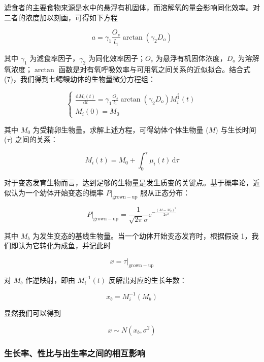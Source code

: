 \documentclass[11pt,a4paper]{ctexart}
\begin{document}
滤食者的主要食物来源是水中的悬浮有机固体，而溶解氧的量会影响同化效率。对二者的浓度加以刻画，可得如下方程

\begin{equation}
a=\gamma_1\frac{O_s}{l_1}\arctan\left(\gamma_2 D_o\right)
\end{equation}

其中 $\gamma_1$ 为滤食率因子，$\gamma_2$ 为同化效率因子；$O_s$ 为悬浮有机固体浓度，$D_o$ 为溶解氧浓度；$\arctan$ 函数是对有氧呼吸效率与可用氧之间关系的近似拟合。结合式 (7)，我们得到七鳃鳗幼体的生物量微分方程组：

\[
\left\{
\begin{array}{l}
\frac{\mathrm{d}M_i(t)}{\mathrm{d}t}=\gamma_1\frac{O_s}{l_1}\arctan\left(\gamma_2 D_o\right)M_i^{\frac{3}{4}}(t)\\[1.2em]
M_i(0)=M_0
\end{array}
\right.
\]

其中 $M_0$ 为受精卵生物量。求解上述方程，可得幼体个体生物量 ($M$) 与生长时间 ($\tau$) 之间的关系：

\begin{equation}
M_i(t)=M_0+\int_{0}^{\tau}\mu_i(t)\,\mathrm{d}\tau
\end{equation}

对于变态发育生物而言，达到足够的生物量是发生质变的关键点。基于概率论，近似认为一个幼体开始变态的概率 $P|_{\mathrm{grown-up}}$ 服从正态分布：

\begin{equation}
P|_{\mathrm{grown-up}}=\frac{1}{\sqrt{2\pi}\sigma}\mathrm{e}^{-\frac{(M-M_b)^2}{2\sigma^2}}
\end{equation}

其中 $M_b$ 为发生变态的基线生物量。当一个幼体开始变态发育时，根据假设 1，我们即认为它转化为成鱼，并记此时

\begin{equation}
x=\tau|_{\mathrm{grown-up}}
\end{equation}

对 $M_b$ 作逆映射，即由 $M_i^{-1}(t)$ 反解出对应的生长年数：

\begin{equation}
x_b=M_i^{-1}(M_b)
\end{equation}

显然我们可以得到

\begin{equation}
x\sim N(x_b,\sigma^2)
\end{equation}

\subsubsection{生长率、性比与出生率之间的相互影响}
\end{document}
